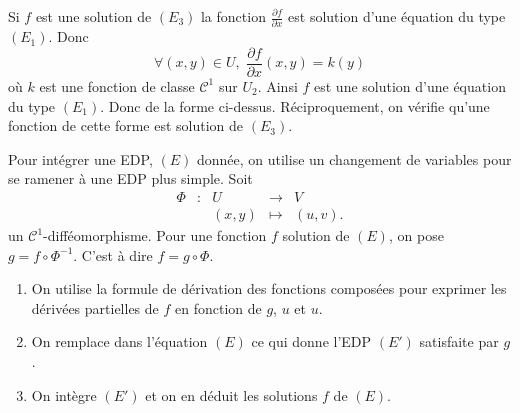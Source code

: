 \documentclass[class=report,crop=false]{standalone}
\begin{document}
\vskip4mm

Si $f$ est une solution de $(E_3)$ la fonction $\displaystyle \frac{\partial f}{\partial x}$ est solution d'une équation du type $(E_1)$. Donc
$$\forall (x,y)\in U,\; \frac{\partial f}{\partial x}(x,y)=k(y)$$
o\`u $k$ est une fonction de classe $\mathscr{C}^1$ sur $U_2$. Ainsi $f$ est une solution d'une équation du type $(E_1)$. Donc de la forme ci-dessus. Réciproquement, on vérifie qu'une fonction de cette forme est solution de $(E_3)$.

\vskip6mm

Pour intégrer une EDP, $(E)$ donnée, on utilise un changement de variables pour se ramener à une EDP plus simple. Soit
$$\begin{array}{ccccl}\Phi &:&U&\to&V\\&&(x,y)&\mapsto &\displaystyle (u,v).\end{array}$$
un $\mathscr{C}^1$-difféomorphisme. Pour une fonction $f$ solution de $(E)$, on pose $g=f\circ \Phi ^{-1}$. C'est à dire $f=g\circ \Phi$.
\begin{enumerate}
\item On utilise la formule de dérivation des fonctions composées pour exprimer les dérivées partielles de $f$ en fonction de $g$, $u$ et $u$.
\item On remplace dans l'équation $(E)$ ce qui donne l'EDP $(E')$ satisfaite par $g$.
\item On intègre $(E')$ et on en déduit les solutions $f$ de $(E)$.
\end{enumerate}

\vskip6mm
\end{document}

